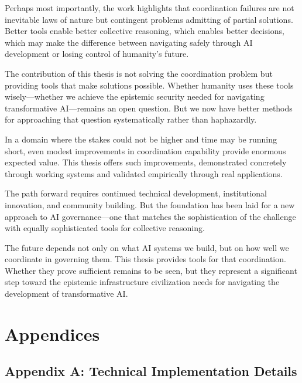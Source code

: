 \documentclass[
  11pt,
  letterpaper,
]{book}
\begin{document}
Perhaps most importantly, the work highlights that coordination failures
are not inevitable laws of nature but contingent problems admitting of
partial solutions. Better tools enable better collective reasoning,
which enables better decisions, which may make the difference between
navigating safely through AI development or losing control of humanity's
future.

The contribution of this thesis is not solving the coordination problem
but providing tools that make solutions possible. Whether humanity uses
these tools wisely---whether we achieve the epistemic security needed
for navigating transformative AI---remains an open question. But we now
have better methods for approaching that question systematically rather
than haphazardly.

In a domain where the stakes could not be higher and time may be running
short, even modest improvements in coordination capability provide
enormous expected value. This thesis offers such improvements,
demonstrated concretely through working systems and validated
empirically through real applications.

The path forward requires continued technical development, institutional
innovation, and community building. But the foundation has been laid for
a new approach to AI governance---one that matches the sophistication of
the challenge with equally sophisticated tools for collective reasoning.

The future depends not only on what AI systems we build, but on how well
we coordinate in governing them. This thesis provides tools for that
coordination. Whether they prove sufficient remains to be seen, but they
represent a significant step toward the epistemic infrastructure
civilization needs for navigating the development of transformative AI.


\chapter*{Appendices}\label{sec-appendices}


\section*{Appendix A: Technical Implementation
Details}\label{sec-appendix-technical}
\end{document}
